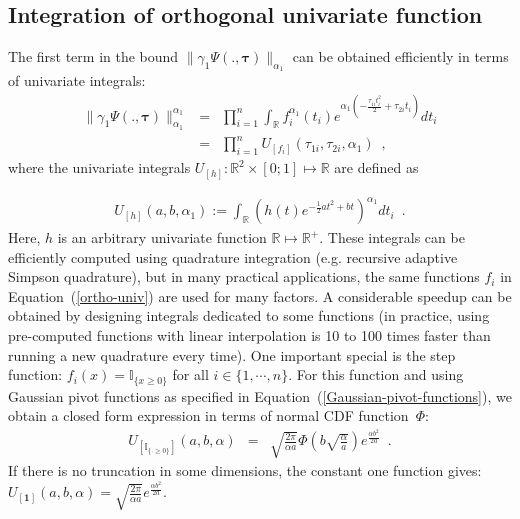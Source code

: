 \documentclass{article} %
\renewcommand{\t}{\mathbf{t}}
\newcommand{\diag}[1]{\mathop{\textrm{diag}}\left(#1\right)}
\newcommand{\transp}{^{T}}
\newcommand{\unigint}[1]{{U}_{\left[#1\right]}}
\def\Indic#1{\mathbb{I}_{\{#1\}}}
\def\u{\mathbf{u}}
\def\btau{{\bm{\tau}}}
\renewcommand{\Re}{\mathbb{R}}
\begin{document}
\subsection{Integration of orthogonal univariate function}
\label{sec:univ-integral}
The first term in the bound $\|\gamma_1\Psi(.,\btau)\|_{\alpha_1}$ can be obtained 
efficiently in terms of univariate integrals:
\begin{eqnarray} 
\|\gamma_1\Psi(.,\btau)\|_{\alpha_1}^{\alpha_1}
&=&
\prod_{i=1}^n
\int_\Re f_i^{\alpha_1}(t_i)
e^{\alpha_1(-\frac{\tau_{1i} t_i^2}2 + \tau_{2i} t_i)}
dt_i
\nonumber\\
&=&
\prod_{i=1}^n
\unigint{f_i}\left(\tau_{1i},\tau_{2i},\alpha_1\right)
\enspace,
\label{ortho-univ}
\end{eqnarray}
where the univariate integrals $\unigint{h}:\Re^2\times [0;1]\mapsto\Re$ are defined as

\begin{eqnarray} 
\unigint{h}(a,b,\alpha_1):=\int_\Re \left(h(t)e^{-\frac 12 a t^2 + b t}\right)^{\alpha_1} dt_i
\enspace.
\end{eqnarray} 
Here, $h$ is an arbitrary univariate function $\Re\mapsto\Re^+$. These integrals
can be efficiently computed using quadrature integration (e.g. recursive
adaptive Simpson quadrature), but in many practical applications, the same
functions $f_i$ in Equation~(\ref{ortho-univ}) are used for many factors. A considerable speedup can be obtained
by designing integrals dedicated to some functions (in practice, using pre-computed functions with linear interpolation 
 is 10 to 100 times faster than running a new quadrature every time). One important special is the step function:
$f_i(x)=\Indic{x\ge 0}$ for all $i\in\{1,\cdots,n\}$.
For this function and using Gaussian pivot functions as specified in Equation~(\ref{Gaussian-pivot-functions}), we obtain a closed form expression in terms of normal CDF function~$\Phi$:			
\begin{eqnarray}
		\unigint{\Indic{\cdot\ge0}}(a,b,\alpha) 
		&		=		&
		\sqrt{\frac{2\pi}{\alpha a}} 
		  \Phi\left(b \sqrt{\frac{\alpha}{a}}\right)
e^{\frac{\alpha b^2}{2 a}}
\enspace.
\end{eqnarray}	
If there is no truncation in some dimensions, the constant one function gives:
$\unigint{\bm{1}}(a,b,\alpha) =\sqrt{\frac{2\pi}{\alpha a}} e^{\frac{\alpha b^2}{2 a}}.$
\end{document}
